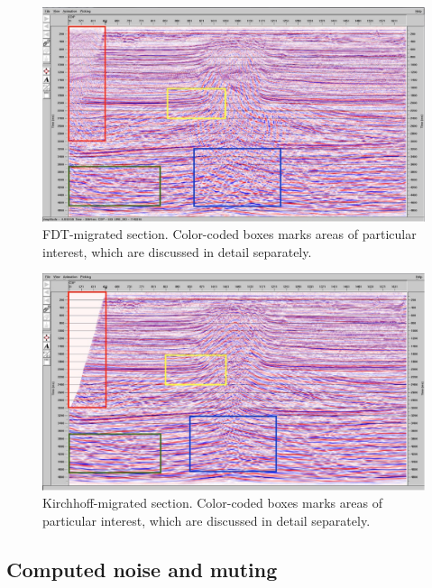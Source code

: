 \documentclass[10pt,a4paper]{article}
\begin{document}
\begin{figure}[H]
\includegraphics[width=\textwidth]{ny2.jpg}
\caption{FDT-migrated section. Color-coded boxes marks areas of particular interest, which are discussed in detail separately.}
\label{ny2}
\end{figure}

\begin{figure}[H]
\includegraphics[width=\textwidth]{ny3.jpg}
\caption{Kirchhoff-migrated section. Color-coded boxes marks areas of particular interest, which are discussed in detail separately.}
\label{ny3}
\end{figure}

\subsection{Computed noise and muting}
\end{document}
